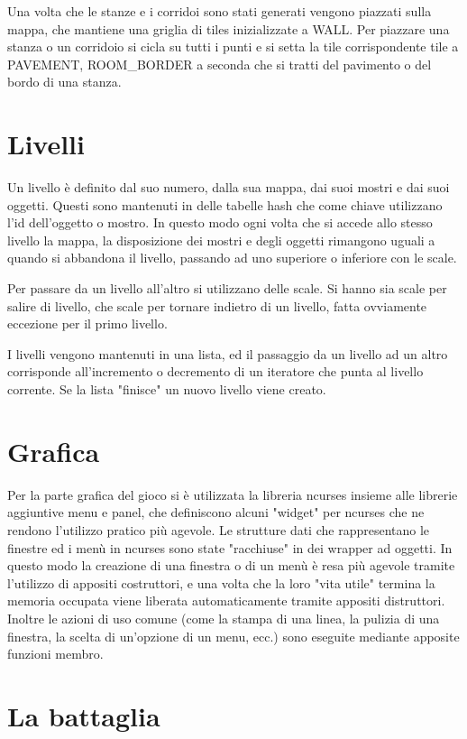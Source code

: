 \documentclass[12pt]{report}
\begin{document}
Una volta che le stanze e i corridoi sono stati generati vengono piazzati sulla mappa, che mantiene una
griglia di tiles inizializzate a WALL. Per piazzare una stanza o un corridoio si cicla su tutti i punti e si
setta la tile corrispondente tile a PAVEMENT, ROOM\_BORDER a seconda che si tratti del pavimento o del bordo di
una stanza.

\section{Livelli}

Un livello è definito dal suo numero, dalla sua mappa, dai suoi mostri e dai suoi oggetti. Questi sono mantenuti in
delle tabelle hash che come chiave utilizzano l'id dell'oggetto o mostro. In questo modo ogni volta che si accede allo
stesso livello la mappa, la disposizione dei mostri e degli oggetti rimangono uguali a quando si abbandona il livello,
passando ad uno superiore o inferiore con le scale.

Per passare da un livello all'altro si utilizzano delle scale. Si hanno sia scale per salire di livello, che scale per
tornare indietro di un livello, fatta ovviamente eccezione per il primo livello.

I livelli vengono mantenuti in una lista, ed il passaggio da un livello ad un altro corrisponde all'incremento o
decremento di un iteratore che punta al livello corrente. Se la lista "finisce" un nuovo livello viene creato.

\section{Grafica}

Per la parte grafica del gioco si è utilizzata la libreria ncurses insieme alle librerie aggiuntive menu e
panel, che definiscono alcuni "widget" per ncurses che ne rendono l'utilizzo pratico più agevole. Le strutture dati che
rappresentano le finestre ed i menù in ncurses sono state "racchiuse" in dei wrapper ad oggetti. In questo modo la
creazione di una finestra o di un menù è resa più agevole tramite l'utilizzo di appositi costruttori, e una volta che
la loro "vita utile" termina la memoria occupata viene liberata automaticamente tramite appositi distruttori. Inoltre le
azioni di uso comune (come la stampa di una linea, la pulizia di una finestra, la scelta di un'opzione di un menu,
ecc.) sono eseguite mediante apposite funzioni membro.

\section{La battaglia}
\end{document}
